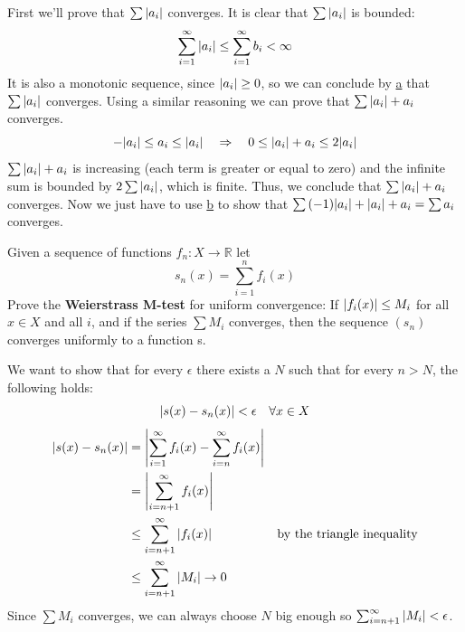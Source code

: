 \documentclass{article}
\def\R{\mathbb{R}}
\DeclarePairedDelimiter\abs{\lvert}{\rvert}%
\begin{document}
    \noindent
    First we'll prove that $\sum{\abs{a_i}}$ converges. It is clear that $\sum{\abs{a_i}}$ is bounded:
    \begin{equation*}
        \sum_{i=1}^\infty{\abs{a_i}} \leq \sum_{i=1}^\infty{b_i} < \infty
    \end{equation*}
    It is also a monotonic sequence, since $\abs{a_i} \geq 0$, so we can conclude by \hyperref[21.11a]{a} that $\sum{\abs{a_i}}$ converges. Using a similar reasoning we can prove that $\sum{\abs{a_i} + a_i}$ converges. 
    \begin{equation*}
        -\abs{a_i} \leq a_i \leq \abs{a_i} \quad \Rightarrow \quad 0 \leq \abs{a_i} + a_i \leq 2\abs{a_i}
    \end{equation*}
    $\sum{\abs{a_i} + a_i}$ is increasing (each term is greater or equal to zero) and the infinite sum is bounded by $2\sum{\abs{a_i}}$, which is finite. Thus, we conclude that $\sum{\abs{a_i} + a_i}$ converges. Now we just have to use \hyperref[21.11b]{b} to show that $\sum{(-1)\abs{a_i} + \abs{a_i} + a_i} = \sum{a_i}$ converges. 
    \begin{tcolorbox}[title=Exercise d]
        Given a sequence of functions $f_n \colon X \to \R$ let
        \begin{equation*}
            s_n(x) = \sum_{i=1}^n{f_i(x)}
        \end{equation*}
        Prove the \textbf{Weierstrass M-test} for uniform convergence: If $\abs{f_i(x)} \leq M_i$ for all $x \in X$ and all $i$, and if the series $\sum{M_i}$ converges, then the sequence $(s_n)$ converges uniformly to a function s.
    \end{tcolorbox}
    \noindent
    We want to show that for every $\epsilon$ there exists a $N$ such that for every $n > N$, the following holds:
    \begin{equation*}
        \abs{s(x) - s_n(x)} < \epsilon \quad \forall x \in X
    \end{equation*}
    \begin{align*}
        \abs{s(x) - s_n(x)} &= \abs*{\sum_{i=1}^\infty{f_i(x)} - \sum_{i=n}^\infty{f_i(x)}} \\
        &= \abs*{\sum_{i=n+1}^\infty{f_i(x)}} \\
        &\leq \sum_{i=n+1}^\infty{\abs{f_i(x)}} & \text{by the triangle inequality} \\
        &\leq \sum_{i=n+1}^\infty{\abs{M_i}} \rightarrow 0
    \end{align*}
    Since $\sum{M_i}$ converges, we can always choose $N$ big enough so $\sum_{i=n+1}^\infty{\abs{M_i}} < \epsilon$.
    
\end{document}
